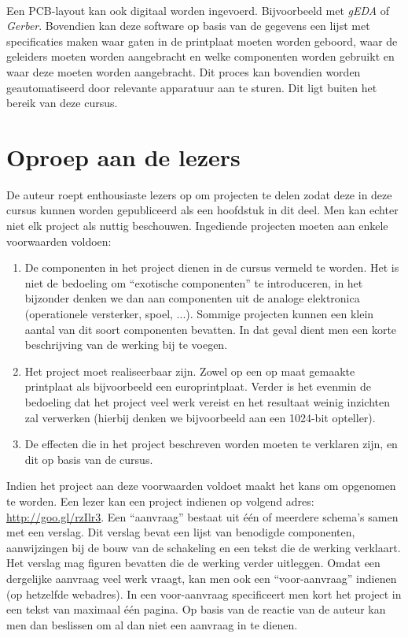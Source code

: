 \paragraph{}
Een PCB-layout kan ook digitaal worden ingevoerd. Bijvoorbeeld met \emph{gEDA} of \emph{Gerber}. Bovendien kan deze software op basis van de gegevens een lijst met specificaties maken waar gaten in de printplaat moeten worden geboord, waar de geleiders moeten worden aangebracht en welke componenten worden gebruikt en waar deze moeten worden aangebracht. Dit proces kan bovendien worden geautomatiseerd door relevante apparatuur aan te sturen. Dit ligt buiten het bereik van deze cursus.
\section{Oproep aan de lezers}
De auteur roept enthousiaste lezers op om projecten te delen zodat deze in deze cursus kunnen worden gepubliceerd als een hoofdstuk in dit deel. Men kan echter niet elk project als nuttig beschouwen. Ingediende projecten moeten aan enkele voorwaarden voldoen:
\begin{enumerate}
 \item De componenten in het project dienen in de cursus vermeld te worden. Het is niet de bedoeling om ``exotische componenten'' te introduceren, in het bijzonder denken we dan aan componenten uit de analoge elektronica (operationele versterker, spoel, ...). Sommige projecten kunnen een klein aantal van dit soort componenten bevatten. In dat geval dient men een korte beschrijving van de werking bij te voegen.
 \item Het project moet realiseerbaar zijn. Zowel op een op maat gemaakte printplaat als bijvoorbeeld een europrintplaat. Verder is het evenmin de bedoeling dat het project veel werk vereist en het resultaat weinig inzichten zal verwerken (hierbij denken we bijvoorbeeld aan een 1024-bit opteller).
 \item De effecten die in het project beschreven worden moeten te verklaren zijn, en dit op basis van de cursus.
\end{enumerate}
Indien het project aan deze voorwaarden voldoet maakt het kans om opgenomen te worden. Een lezer kan een project indienen op volgend adres: \url{http://goo.gl/rzIlr3}. Een ``aanvraag'' bestaat uit \'e\'en of meerdere schema's samen met een verslag. Dit verslag bevat een lijst van benodigde componenten, aanwijzingen bij de bouw van de schakeling en een tekst die de werking verklaart. Het verslag mag figuren bevatten die de werking verder uitleggen. Omdat een dergelijke aanvraag veel werk vraagt, kan men ook een ``voor-aanvraag'' indienen (op hetzelfde webadres). In een voor-aanvraag specificeert men kort het project in een tekst van maximaal \'e\'en pagina. Op basis van de reactie van de auteur kan men dan beslissen om al dan niet een aanvraag in te dienen.